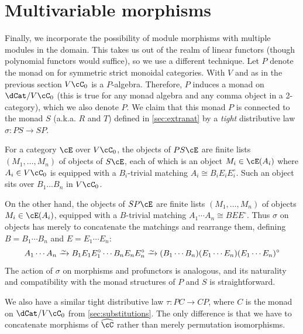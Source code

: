 \documentclass{amsart}
\newcommand{\C}{\cC}
\renewcommand{\Chat}{\ensuremath{\widehat{\C}}\xspace}
\newcommand{\E}{\cE}
\renewcommand{\o}{^{\circ}}
\begin{document}




\section{Multivariable morphisms}
\label{sec:multivar}

Finally, we incorporate the possibility of module morphisms with multiple modules in the domain.
This takes us out of the realm of linear functors (though polynomial functors would suffice), so we use a different technique.
Let $P$ denote the monad on \dCat for symmetric strict monoidal categories.
With $V$ and \C as in the previous section $V\C_0$ is a $P$-algebra.
Therefore, $P$ induces a monad on $\dCat/V\C_0$ (this is true for any monad algebra and any comma object in a 2-category), which we also denote $P$.
We claim that this monad $P$ is connected to the monad $S$ (a.k.a. $R$ and $T$) defined in \cref{sec:extranat} by a \emph{tight} distributive law $\sigma : P S \to S P$.

For a category $\E$ over $V\C_0$, the objects of $P S \E$ are finite lists $(M_1,\dots,M_n)$ of objects of $S\E$, each of which is an object $M_i \in \E(A_i)$ where $A_i\in V\C_0$ is equipped with a $B_i$-trivial matching $A_i\cong B_i E_i E_i\o$.
Such an object sits over $B_1\dots B_n$ in $V\C_0$.

On the other hand, the objects of $S P \E$ are finite lists $(M_1,\dots,M_n)$ of objects $M_i \in \E(A_i)$, equipped with a $B$-trivial matching $A_1\cdots A_n \cong B E E\o$.
Thus $\sigma$ on objects has merely to concatenate the matchings and rearrange them, defining $B = B_1\cdots B_n$ and $E = E_1\cdots E_n$:
\[ A_1\cdots A_n \toiso B_1 E_1 E_1\o \cdots B_n E_n E_n\o \toiso (B_1\cdots B_n)(E_1\cdots E_n)(E_1\cdots E_n)\o \]
The action of $\sigma$ on morphisms and profunctors is analogous, and its naturality and compatibility with the monad structures of $P$ and $S$ is straightforward.

We also have a similar tight distributive law $\tau : P C \to C P$, where $C$ is the monad on $\dCat/V\C_0$ from \cref{sec:substitutions}.
The only difference is that we have to concatenate morphisms of $\Chat$ rather than merely permutation isomorphisms.
\end{document}
